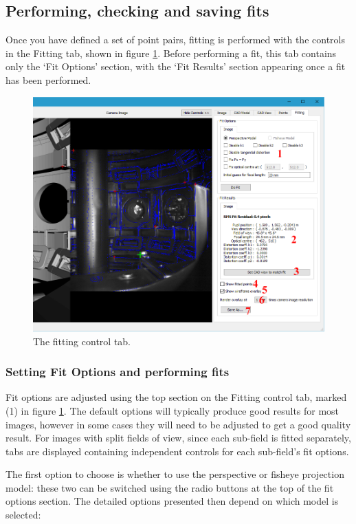 \documentclass[12pt]{article}
\begin{document}
\subsection{Performing, checking and saving fits}

Once you have defined a set of point pairs, fitting is performed with the controls in the Fitting tab, shown in figure \ref{fig:fitting}. Before performing a fit, this tab contains only the `Fit Options' section, with the `Fit Results' section appearing once a fit has been performed.

\begin{figure}[ht]
\includegraphics[width=\textwidth]{fitting.PNG}
\caption{\label{fig:fitting} The fitting control tab.}
\end{figure}

\subsubsection{Setting Fit Options and performing fits}
Fit options are adjusted using the top section on the Fitting control tab, marked (1) in figure \ref{fig:fitting}. The default options will typically produce good results for most images, however in some cases they will need to be adjusted to get a good quality result. For images with split fields of view, since each sub-field is fitted separately, tabs are displayed containing independent controls for each sub-field's fit options.

The first option to choose is whether to use the perspective or fisheye projection model: these two can be switched using the radio buttons at the top of the fit options section. The detailed options presented then depend on which model is selected:
\end{document}
